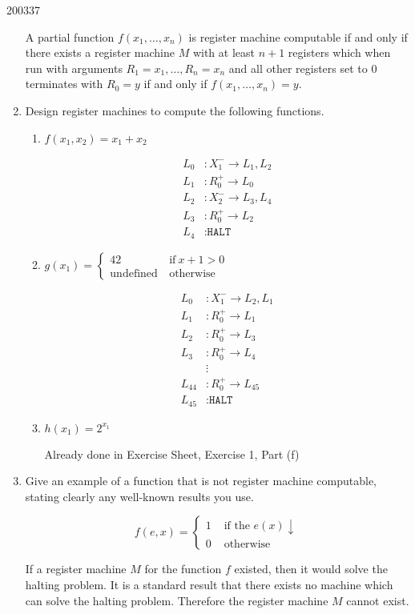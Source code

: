 \documentclass[10pt,\jkfside,a4paper]{article}
\begin{document}
\begin{examquestion}{2003}{3}{7}
\begin{enumerate}
A partial function $f(x_1, \dots, x_n)$ is register machine computable if
and only if there exists a register machine $M$ with at least $n + 1$
registers which when run with arguments $R_1 = x_1, \dots, R_n = x_n$ and
all other registers set to $0$ terminates with $R_0 = y$ if and only
if $f(x_1, \dots, x_n) = y$.

\item Design register machines to compute the following functions.

\begin{enumerate}

\item $f(x_1, x_2) = x_1 + x_2$

\begin{align*}
L_0 &: X_1^- \to L_1, L_2 \\
L_1 &: R_0^+ \to L_0 \\
L_2 &: X_2^- \to L_3, L_4 \\
L_3 &: R_0^+ \to L_2 \\
L_4 &: \texttt{HALT}
\end{align*}

\item $g(x_1) = \begin{cases}
42 & \ \text{if} \ x+1 > 0 \\
\text{undefined} & \ \text{otherwise}
\end{cases} $

\begin{align*}
L_0 &: X_1^- \to L_2, L_1 \\
L_1 &: R_0^+ \to L_1 \\
L_2 &: R_0^+ \to L_3 \\
L_3 &: R_0^+ \to L_4 \\
&\vdots \\
L_{44} &: R_0^+ \to L_{45} \\
L_{45} &: \texttt{HALT}
\end{align*}

\item $h(x_1) = 2^{x_1}$

Already done in Exercise Sheet, Exercise 1, Part (f)

\end{enumerate}

\item Give an example of a function that is not register machine computable,
stating clearly any well-known results you use.

\[
f(e, x) = \begin{cases}
1 & \text{ if the } e(x)\downarrow \\
0 & \text{ otherwise}
\end{cases}
\]

If a register machine $M$ for the function $f$ existed, then it would solve
the halting problem. It is a standard result that there exists no machine
which can solve the halting problem. Therefore the register machine $M$
cannot exist.

\end{enumerate}

\end{examquestion}
\end{document}
